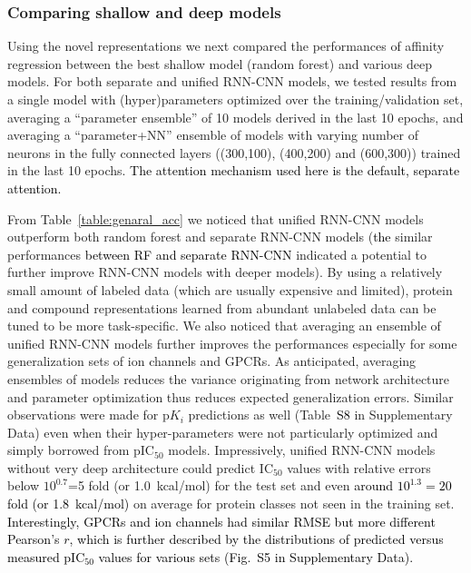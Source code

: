 \documentclass[nocrop]{bioinfo}
\newcommand{\red}[1]{\textcolor{black}{#1}}
\begin{document}
\vspace{-1em}
\subsubsection{Comparing shallow and deep models}

Using the novel representations we next compared the performances of affinity regression between the best shallow model  (random forest) and various deep models.  For both separate and unified RNN-CNN models, we tested results from a single model with (hyper)parameters optimized over the training/validation set, averaging a ``parameter ensemble'' of 10 models derived in the last 10 epochs, and averaging a ``parameter+NN'' ensemble of models with varying number of neurons in the fully connected layers  ((300,100), (400,200) and  (600,300)) trained in the last 10 epochs.  \red{The attention mechanism used here is the default, separate attention.} 



From Table~\ref{table:genaral_acc} we noticed that unified RNN-CNN models outperform both random forest and separate RNN-CNN models  (\red{the} similar performances \red{between RF and separate RNN-CNN} indicated a potential to further improve RNN-CNN models with deeper models).  By using a relatively small amount of labeled data  (which are usually expensive and limited), protein and compound representations learned from abundant unlabeled data can be tuned to be more task-specific.  We also noticed that averaging an ensemble of unified RNN-CNN models further improves the performances especially for some generalization sets of ion channels and GPCRs. As anticipated, averaging ensembles of models reduces the variance  originating from network architecture and parameter optimization thus reduces expected generalization errors.  Similar observations were made for p$K_i$ predictions as well (Table~\red{S8} in Supplementary Data) even when their hyper-parameters were not particularly optimized and simply borrowed from pIC$_{50}$ models.  Impressively, unified RNN-CNN models without very deep architecture could predict IC$_{50}$ values with relative errors below $10^{0.7}$=5 fold  (or 1.0~kcal/mol) for the test set and even \red{around $10^{1.3}=20$ fold  (or 1.8~kcal/mol)} on average for protein classes not seen in the training set.  \red{Interestingly, GPCRs and ion channels had similar RMSE but more different Pearson's $r$, which is further described by the distributions of predicted versus measured pIC$_{50}$ values for various sets (Fig.~S5 in Supplementary Data).}  
\end{document}
